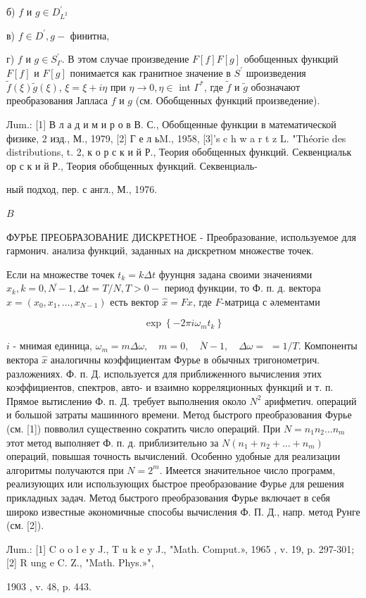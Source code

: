 \documentclass[10pt]{article}
\begin{document}
б) $f$ и $g \in D_{L^{2}}^{\prime}$



в) $f \in D^{\prime}, g-$ финитна,



г) $f$ и $g \in S_{\Gamma}^{\prime}$. В этом случае произведение $F[f] F[g]$ обобщенных функций $F[f]$ и $F[g]$ понимается как гранитное значение в $S^{\prime}$ шроизведения $\tilde{f}(\xi) \tilde{g}(\xi)$, $\xi=\xi+i \eta$ при $\eta \rightarrow 0, \eta \in$ int $\Gamma^{*}$, где $\tilde{f}$ и $\tilde{g}$ обозначают преобразования Јапласа $f$ и $g$ (см. Обобщенных функций произведение).



Лum.: [1] В л а д и м и р о в В. С., Обобщенные функции в математической физике, 2 изд., М., 1979, [2] Г е л ьM., 1958, [3]'s c h w a r t z L. "Théorie des distributions, t. 2, к о р с к и й Р., Теория обобщенных функций. Секвенциальк ор с к и й Р., Теория обобщенных функций. Секвенциаль-

ный подход, пер. с англ., М., 1976.

$B$



ФУРЬЕ ПРЕОБРАЗОВАНИЕ ДИСКРЕТНОЕ - Преобразование, используемое для гармонич. анализа функций, заданных на дискретном множестве точек.



Если на множестве точек $t_{k}=k \Delta t$ фуунцня задана своими значениями $x_{k}, k=\overline{0, N-1}, \Delta t=T / N, T>0-$ период функции, то Ф. п. д. вектора $x=\left(x_{0}, x_{1}, \ldots, x_{N-1}\right)$ есть вектор $\hat{x}=F x$, где $F$-матрица с әлементами



\[

\exp \left\{-2 \pi i \omega_{m} t_{k}\right\}

\]



$i$ - мнимая единица, $\omega_{m}=m \Delta \omega, \quad m=\overline{0, \quad N-1}, \quad \Delta \omega=$ $=1 / T$. Компоненты вектора $\hat{x}$ аналогичны коэффициентам Фурье в обычных тригонометрич. разложениях. Ф. п. Д. используется для приближенного вычисления этих коэффициентов, спектров, авто- и взаимно корреляционных функций и т. п. Прямое вытислениө Ф. п. Д. требует выполнения около $N^{2}$ арифметич. операций и большой затраты машинного времени. Метод быстрого преобразования Фурье (см. [1]) повволил существенно сократить число операций. При $N=n_{1} n_{2} \ldots n_{m}$ этот метод выполняет Ф. п. д. приблизительно за $N\left(n_{1}+n_{2}+\ldots+n_{m}\right)$ операций, повышая точность вычислений. Особенно удобные для реализации алгоритмы получаются при $N=2^{m}$. Имеется значительное число программ, реализующих или использующих быстрое преобразование Фурье для решения прикладных задач. Метод быстрого преобразования Фурье включает в себя широко известные әкономичные способы вычисления Ф. П. Д., напр. метод Рунге (см. [2]).



Лum.: [1] C o o l e y J., T u k e y J., "Math. Comput.», 1965 , v. 19, p. 297-301; [2] R ung e C. Z., "Math. Phys.»",

1903 , v. 48, p. 443.
\end{document}
